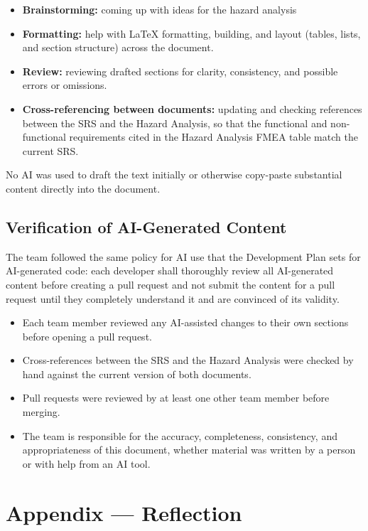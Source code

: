\documentclass{article}
\begin{document}
\begin{itemize}
  \item \textbf{Brainstorming:} coming up with ideas for the hazard analysis
  \item \textbf{Formatting:} help with LaTeX formatting, building, and layout (tables,
  lists, and section structure) across the document.
  \item \textbf{Review:} reviewing drafted sections for clarity, consistency,
  and possible errors or omissions.
  \item \textbf{Cross-referencing between documents:} updating and checking
  references between the SRS and the Hazard Analysis, so that the functional
  and non-functional requirements cited in the Hazard Analysis FMEA table
  match the current SRS.
\end{itemize}

No AI was used to draft the text initially or otherwise copy-paste substantial content
directly into the document. 

\subsection{Verification of AI-Generated Content}


The team followed the same policy for AI use that the Development Plan sets
for AI-generated code: each developer shall thoroughly review all
AI-generated content before creating a pull request and not submit the
content for a pull request until they completely understand it and are
convinced of its validity.

\begin{itemize}
  \item Each team member reviewed any AI-assisted changes to their own
  sections before opening a pull request.
  \item Cross-references between the SRS and the Hazard Analysis were checked
  by hand against the current version of both documents.
  \item Pull requests were reviewed by at least one other team member before merging.
  \item The team is responsible for the accuracy, completeness, consistency,
  and appropriateness of this document, whether material was written by a
  person or with help from an AI tool.
\end{itemize}

\newpage{}

\section{Appendix --- Reflection}
\end{document}
